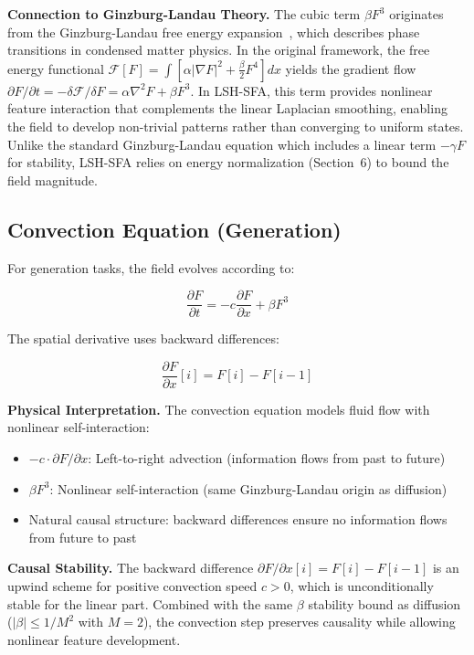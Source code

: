 \documentclass{article}
\begin{document}
\textbf{Connection to Ginzburg-Landau Theory.} The cubic term $\beta F^3$ originates from the Ginzburg-Landau free energy expansion~\citep{ginzburg1950k}, which describes phase transitions in condensed matter physics. In the original framework, the free energy functional $\mathcal{F}[F] = \int \left[\alpha |\nabla F|^2 + \frac{\beta}{2} F^4\right] dx$ yields the gradient flow $\partial F/\partial t = -\delta\mathcal{F}/\delta F = \alpha \nabla^2 F + \beta F^3$. In LSH-SFA, this term provides nonlinear feature interaction that complements the linear Laplacian smoothing, enabling the field to develop non-trivial patterns rather than converging to uniform states. Unlike the standard Ginzburg-Landau equation which includes a linear term $-\gamma F$ for stability, LSH-SFA relies on energy normalization (Section~6) to bound the field magnitude.

\subsection{Convection Equation (Generation)}

For generation tasks, the field evolves according to:

\begin{equation}
\frac{\partial F}{\partial t} = -c \frac{\partial F}{\partial x} + \beta F^3
\end{equation}

The spatial derivative uses backward differences:

\begin{equation}
\frac{\partial F}{\partial x}[i] = F[i] - F[i-1]
\end{equation}

\textbf{Physical Interpretation.} The convection equation models fluid flow with nonlinear self-interaction:
\begin{itemize}
\item $-c \cdot \partial F/\partial x$: Left-to-right advection (information flows from past to future)
\item $\beta F^3$: Nonlinear self-interaction (same Ginzburg-Landau origin as diffusion)
\item Natural causal structure: backward differences ensure no information flows from future to past
\end{itemize}

\textbf{Causal Stability.} The backward difference $\partial F/\partial x[i] = F[i] - F[i-1]$ is an upwind scheme for positive convection speed $c > 0$, which is unconditionally stable for the linear part. Combined with the same $\beta$ stability bound as diffusion ($|\beta| \leq 1/M^2$ with $M = 2$), the convection step preserves causality while allowing nonlinear feature development.
\end{document}
